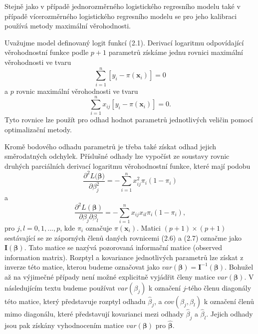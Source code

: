 Stejně jako v případě jednorozměrného logistického regresního modelu také v případě vícerozměrného logistického regresního modelu se pro jeho kalibraci používá metody maximální věrohodnosti.

Uvažujme model definovaný logit funkcí (2.1). Derivací logaritmu odpovídající věrohodnostní funkce podle $p + 1$ parametrů získáme jednu rovnici maximální věrohodnosti ve tvaru
\begin{equation}
\sum_{i = 1}^n [y_i - \pi(\pmb{x}_i)] = 0
\end{equation}
a $p$ rovnic maximální věrohodnosti ve tvaru
\begin{equation}
\sum_{i = 1}^n x_{ij} [y_i - \pi(\pmb{x}_i)] = 0.
\end{equation}
Tyto rovnice lze použít pro odhad hodnot parametrů jednotlivých veličin pomocí optimalizační metody.

Kromě bodového odhadu parametrů je třeba také získat odhad jejich směrodatných odchylek. Příslušné odhady lze vypočíst ze soustavy rovnic druhých parciálních derivací logaritmu věrohodnostní funkce, které mají podobu
\begin{equation}
\frac{\partial^2 L(\pmb{\beta)}}{\partial \beta_j^2} = - \sum_{i = 1}^n x_{ij}^2 \pi_i(1 - \pi_i)
\end{equation}
a
\begin{equation}
\frac{\partial^2 L(\pmb{\beta})}{\partial \beta_j \partial \beta_l} = - \sum_{i = 1}^n x_{ij} x_{il} \pi_i (1 - \pi_i),
\end{equation}
pro $j, l = 0, 1, ..., p$, kde $\pi_i$ označuje $\pi(\pmb{x}_i)$. Matici $(p + 1) \times (p + 1)$ sestávající se ze záporných členů daných rovnicemi (2.6) a (2.7) označme jako $\pmb{I}(\pmb{\beta})$. Tato matice se nazývá pozorovaná informační matice (observed information matrix). Rozptyl a kovariance jednotlivých parametrů lze získat z inverze této matice, kterou budeme označovat jako $var(\pmb{\beta}) = \pmb{I}^{-1}(\pmb{\beta})$. Bohužel až na výjimečné případy není možné explicitně vyjádřit členy matice $var(\pmb{\beta})$. V následujícím textu budeme používat $var(\beta_j)$ k označení $j$-tého členu diagonály této matice, který představuje rozptyl odhadu $\hat{\beta}_j$, a $cov(\beta_j, \beta_l)$ k označení členů mimo diagonálu, které představují kovarianci mezi odhady $\hat{\beta}_j$ a $\hat{\beta}_l$. Jejich odhady jsou pak získány vyhodnocením matice $var(\pmb{\beta})$ pro $\hat{\pmb{\beta}}$.

